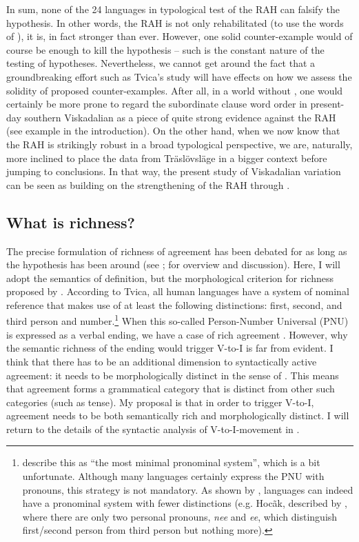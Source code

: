 \documentclass[output=paper,colorlinks,citecolor=brown,draft,draftmode]{langscibook}
\begin{document}
In sum, none of the 24 languages in  typological test of the RAH can falsify the hypothesis. In other words, the RAH is not only rehabilitated (to use the words of \citealt{KoenemanZeijlstra2014}), it is, in fact stronger than ever. However, one solid counter-example would of course be enough to kill the hypothesis – such is the constant nature of the testing of hypotheses. Nevertheless, we cannot get around the fact that a groundbreaking effort such as Tvica’s study will have effects on how we assess the solidity of proposed counter-examples. After all, in a world without \citet{Tvica2017}, one would certainly be more prone to regard the subordinate clause word order in present-day southern Viskadalian as a piece of quite strong evidence against the RAH (see example  in the introduction). On the other hand, when we now know that the RAH is strikingly robust in a broad typological perspective, we are, naturally, more inclined to place the data from Träslövsläge in a bigger context before jumping to conclusions. In that way, the present study of Viskadalian variation can be seen as building on the strengthening of the RAH through \citet{Tvica2017}.


\subsection{What is richness?}\label{sec:petzell:4.2}


The precise formulation of richness of agreement has been debated for as long as the hypothesis has been around (see \citealt{Vikner1997}; \citealt{Rohrbacher1999} for overview and discussion). Here, I will adopt the semantics of  definition, but the morphological criterion for richness proposed by \citet{BobaljikThrainsson1998}. According to Tvica, all human languages have a system of nominal reference that makes use of at least the following distinctions: first, second, and third person and number.\footnote{\citet[573–574]{KoenemanZeijlstra2014} describe this as “the most minimal pronominal system”, which is a bit unfortunate. Although many languages certainly express the PNU with pronouns, this strategy is not mandatory. As shown by \citet{Harbour2016}, languages can indeed have a pronominal system with fewer distinctions (e.g. Hocãk, described by \citealt{Lipkind1945}, where there are only two personal pronouns, \textit{nee} and \textit{ee}, which distinguish first/second person from third person but nothing more).} When this so-called Person-Number Universal (PNU) is expressed as a verbal ending, we have a case of rich agreement \citep[32]{Tvica2017}. However, why the semantic richness of the ending would trigger V-to-I is far from evident. I think that there has to be an additional dimension to syntactically active agreement: it needs to be morphologically distinct in the sense of \citet{BobaljikThrainsson1998}. This means that agreement forms a grammatical category that is distinct from other such categories (such as tense). My proposal is that in order to trigger V-to-I, agreement needs to be both semantically rich and morphologically distinct. I will return to the details of the syntactic analysis of V-to-I-movement in .
\end{document}
